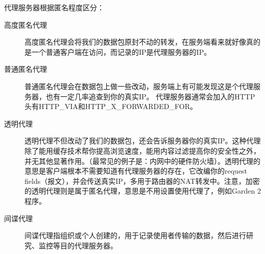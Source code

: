 代理服务器根据匿名程度区分：
\begin{description}
\item[高度匿名代理]高度匿名代理会将我们的数据包原封不动的转发，在服务端看来就好像真的是一个普通客户端在访问，而记录的IP是代理服务器的IP。
\item[普通匿名代理]普通匿名代理会在数据包上做一些改动，服务端上有可能发现这是个代理服务器，也有一定几率追查到你的真实IP。
代理服务器通常会加入的HTTP头有HTTP\_VIA和HTTP\_X\_FORWARDED\_FOR。
\item[透明代理]透明代理不但改动了我们的数据包，还会告诉服务器你的真实IP。这种代理除了能用缓存技术帮你提高浏览速度，能用内容过滤提高你的安全性之外，并无其他显著作用。（最常见的例子是：内网中的硬件防火墙）。透明代理的意思是客户端根本不需要知道有代理服务器的存在，它改编你的request fields（报文），并会传送真实IP，多用于路由器的NAT转发中。注意，加密的透明代理则是属于匿名代理，意思是不用设置使用代理了，例如Garden 2程序。
\item[间谍代理]间谍代理指组织或个人创建的，用于记录使用者传输的数据，然后进行研究、监控等目的代理服务器。
\end{description}
















